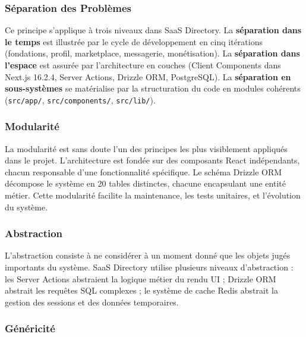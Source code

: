\subsubsection{Séparation des Problèmes}



Ce principe s'applique à trois niveaux dans SaaS Directory. La \textbf{séparation dans le temps} est illustrée par le cycle de développement en cinq itérations (fondations, profil, marketplace, messagerie, monétisation). La \textbf{séparation dans l'espace} est assurée par l'architecture en couches (Client Components dans Next.js 16.2.4, Server Actions, Drizzle ORM, PostgreSQL). La \textbf{séparation en sous-systèmes} se matérialise par la structuration du code en modules cohérents (\texttt{src/app/}, \texttt{src/components/}, \texttt{src/lib/}).



\subsubsection{Modularité}



La modularité est sans doute l'un des principes les plus visiblement appliqués dans le projet. L'architecture est fondée sur des composants React indépendants, chacun responsable d'une fonctionnalité spécifique. Le schéma Drizzle ORM décompose le système en 20 tables distinctes, chacune encapsulant une entité métier. Cette modularité facilite la maintenance, les tests unitaires, et l'évolution du système.



\subsubsection{Abstraction}



L'abstraction consiste à ne considérer à un moment donné que les objets jugés importants du système. SaaS Directory utilise plusieurs niveaux d'abstraction : les Server Actions abstraient la logique métier du rendu UI ; Drizzle ORM abstrait les requêtes SQL complexes ; le système de cache Redis abstrait la gestion des sessions et des données temporaires.



\subsubsection{Généricité}



